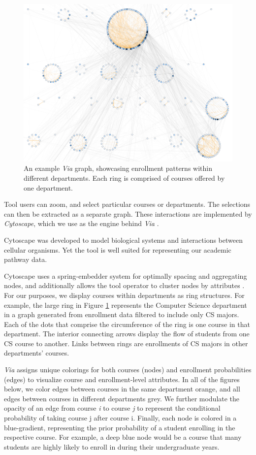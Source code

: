 \begin{figure}
    \centering
    \includegraphics[width=\columnwidth]{Figs/final-overview.pdf}
    \caption{An example {\em Via} graph, showcasing enrollment
      patterns within different departments. Each ring is comprised of
      courses offered by one department.}
    \label{fig:overview}
\end{figure}
Tool users can zoom, and select particular courses or
departments. The selections can then be extracted as a separate
graph. These interactions are implemented by \textit{Cytoscape}, which
we use as the engine behind {\em Via} \cite{shannon2003cytoscape}.

Cytoscape was developed to model biological systems and interactions
between cellular organisms. Yet the tool is well suited for
representing our academic pathway data.

Cytoscape uses a spring-embedder system for optimally spacing and
aggregating nodes, and additionally allows the tool operator to
cluster nodes by attributes \cite{Battista1994}. For our purposes, we
display courses within departments as ring structures. For example,
the large ring in Figure \ref{fig:overview} represents the Computer
Science department in a graph generated from enrollment data filtered
to include only CS majors. Each of the dots that comprise the
circumference of the ring is one course in that department. The
interior connecting arrows display the flow of students from one CS
course to another. Links between rings are enrollments of CS majors in
other departments' courses.

{\em Via} assigns unique colorings for both courses (nodes) and
enrollment probabilities (edges) to visualize course and
enrollment-level attributes. In all of the figures below, we color
edges between courses in the same department orange, and all edges
between courses in different departments grey. We further modulate the
opacity of an edge from course \textit{i} to course \textit{j} to
represent the conditional probability of taking course j after course
i. Finally, each node is colored in a blue-gradient, representing the
prior probability of a student enrolling in the respective course. For
example, a deep blue node would be a course that many students are
highly likely to enroll in during their undergraduate years.


